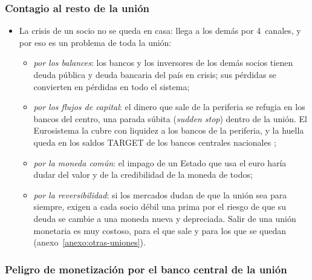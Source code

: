 \documentclass[11pt]{article}
\begin{document}
\subsubsection{Contagio al resto de la unión}\label{sec:contagio}

\begin{itemize}
\item La crisis de un socio no se queda en casa: llega a los demás por 4~canales, y por eso es un problema de toda la unión:
  \begin{itemize}
  \item \emph{por los balances}: los bancos y los inversores de los demás socios tienen deuda pública y deuda bancaria del país en crisis; sus pérdidas se convierten en pérdidas en todo el sistema;
  \item \emph{por los flujos de capital}: el dinero que sale de la periferia se refugia en los bancos del centro, una parada súbita (\emph{sudden stop}) dentro de la unión. El Eurosistema la cubre con liquidez a los bancos de la periferia, y la huella queda en los saldos TARGET de los bancos centrales nacionales  ;
  \item \emph{por la moneda común}: el impago de un Estado que usa el euro haría dudar del valor y de la credibilidad de la moneda de todos;
  \item \emph{por la reversibilidad}: si los mercados dudan de que la unión sea para siempre, exigen a cada socio débil una prima por el riesgo de que su deuda se cambie a una moneda nueva y depreciada. Salir de una unión monetaria es muy costoso, para el que sale y para los que se quedan (anexo~\ref{anexo:otras-uniones}).
  \end{itemize}
\end{itemize}

\subsubsection{Peligro de monetización por el banco central de la unión}\label{sec:monetizacion}
\end{document}
